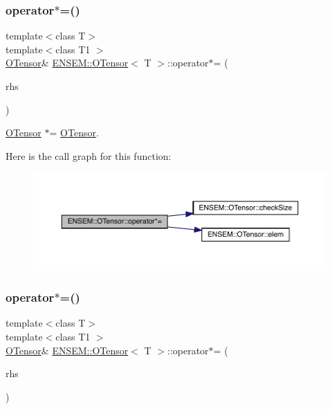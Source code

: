 \subsubsection{\texorpdfstring{operator$\ast$=()}{operator*=()}\hspace{0.1cm}{\footnotesize\ttfamily [3/4]}}
{\footnotesize\ttfamily template$<$class T$>$ \\
template$<$class T1 $>$ \\
\mbox{\hyperlink{classENSEM_1_1OTensor}{O\+Tensor}}\& \mbox{\hyperlink{classENSEM_1_1OTensor}{E\+N\+S\+E\+M\+::\+O\+Tensor}}$<$ T $>$\+::operator$\ast$= (\begin{DoxyParamCaption}\item[{const \mbox{\hyperlink{classENSEM_1_1OTensor}{O\+Tensor}}$<$ T1 $>$ \&}]{rhs }\end{DoxyParamCaption})\hspace{0.3cm}{\ttfamily [inline]}}



\mbox{\hyperlink{classENSEM_1_1OTensor}{O\+Tensor}} $\ast$= \mbox{\hyperlink{classENSEM_1_1OTensor}{O\+Tensor}}. 

Here is the call graph for this function\+:
\nopagebreak
\begin{figure}[H]
\begin{center}
\leavevmode
\includegraphics[width=350pt]{da/d8a/classENSEM_1_1OTensor_a6edba72b265fa3629417ad85c9ae1477_cgraph}
\end{center}
\end{figure}
\mbox{\label{classENSEM_1_1OTensor_a6edba72b265fa3629417ad85c9ae1477}} 
\subsubsection{\texorpdfstring{operator$\ast$=()}{operator*=()}\hspace{0.1cm}{\footnotesize\ttfamily [4/4]}}
{\footnotesize\ttfamily template$<$class T$>$ \\
template$<$class T1 $>$ \\
\mbox{\hyperlink{classENSEM_1_1OTensor}{O\+Tensor}}\& \mbox{\hyperlink{classENSEM_1_1OTensor}{E\+N\+S\+E\+M\+::\+O\+Tensor}}$<$ T $>$\+::operator$\ast$= (\begin{DoxyParamCaption}\item[{const \mbox{\hyperlink{classENSEM_1_1OTensor}{O\+Tensor}}$<$ T1 $>$ \&}]{rhs }\end{DoxyParamCaption})\hspace{0.3cm}{\ttfamily [inline]}}



